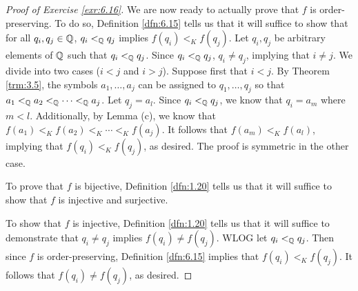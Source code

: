 \documentclass[../main.tex]{subfiles}
\begin{document}
\begin{exercise}
\begin{proof}[Proof of Exercise \ref{exr:6.16}]
        We are now ready to actually prove that $f$ is order-preserving. To do so, Definition \ref{dfn:6.15} tells us that it will suffice to show that for all $q_i,q_j\in\mathbb{Q}$, $q_i<_{\mathbb{Q}} q_j$ implies $f(q_i)<_Kf(q_j)$. Let $q_i,q_j$ be arbitrary elements of $\mathbb{Q}$ such that $q_i<_{\mathbb{Q}} q_j$. Since $q_i<_{\mathbb{Q}} q_j$, $q_i\neq q_j$, implying that $i\neq j$. We divide into two cases ($i<j$ and $i>j$). Suppose first that $i<j$. By Theorem \ref{trm:3.5}, the symbols $a_1,\dots,a_j$ can be assigned to $q_1,\dots,q_j$ so that $a_1<_{\mathbb{Q}} a_2<_{\mathbb{Q}} \cdots<_{\mathbb{Q}} a_j$. Let $q_j=a_l$. Since $q_i<_{\mathbb{Q}} q_j$, we know that $q_i=a_m$ where $m<l$. Additionally, by Lemma (c), we know that $f(a_1)<_Kf(a_2)<_K\cdots<_Kf(a_j)$. It follows that $f(a_m)<_Kf(a_l)$, implying that $f(q_i)<_Kf(q_j)$, as desired. The proof is symmetric in the other case.\par\smallskip
        To prove that $f$ is bijective, Definition \ref{dfn:1.20} tells us that it will suffice to show that $f$ is injective and surjective.\par
        To show that $f$ is injective, Definition \ref{dfn:1.20} tells us that it will suffice to demonstrate that $q_i\neq q_j$ implies $f(q_i)\neq f(q_j)$. WLOG let $q_i<_{\mathbb{Q}} q_j$. Then since $f$ is order-preserving, Definition \ref{dfn:6.15} implies that $f(q_i)<_Kf(q_j)$. It follows that $f(q_i)\neq f(q_j)$, as desired.\par

\end{proof}
\end{exercise}
\end{document}
